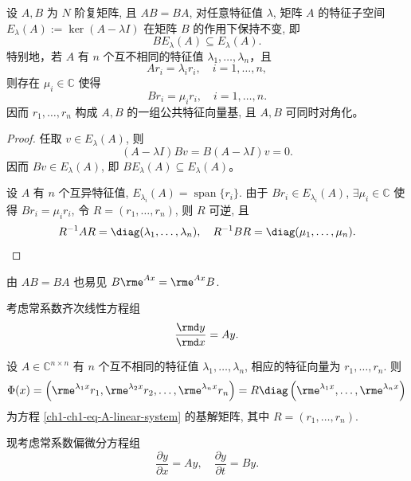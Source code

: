 \begin{lemma}\label{ch1-lem-commuting-matrices}
    设 $A, B$ 为 $N$ 阶复矩阵, 且 $AB=BA$, 对任意特征值 $\lambda$, 矩阵 $A$ 的特征子空间 $E_{\lambda}(A) := \ker(A-\lambda I)$ 在矩阵 $B$ 的作用下保持不变, 即
    \begin{equation}
        B E_{\lambda}(A) \subseteq E_{\lambda}(A).
    \end{equation}
    特别地，若 $A$ 有 $n$ 个互不相同的特征值
    $\lambda_{1},\ldots,\lambda_{n}$，且
    \begin{equation}
        A r_{i} =\lambda_{i} r_{i}, \quad i = 1, \ldots, n,
    \end{equation}
    则存在 $\mu_i\in\mathbb{C}$ 使得
    \begin{equation}
        B r_{i}=\mu_{i} r_{i}, \quad i = 1, \ldots, n.
    \end{equation}
    因而 $r_1,\ldots,r_n$ 构成 $A,B$ 的一组公共特征向量基, 且 $A,B$ 可同时对角化。
\end{lemma}

\begin{proof}
    任取 $v\in E_{\lambda}(A)$, 则
    \begin{equation}
        (A-\lambda I)Bv = B(A-\lambda I)v = 0.
    \end{equation}
    因而 $Bv\in E_{\lambda}(A)$, 即
    $B E_{\lambda}(A)\subseteq E_{\lambda}(A)$。

    设 $A$ 有 $n$ 个互异特征值, $E_{\lambda_{i}}(A) = \operatorname{span} \{r_i\}$. 由于 $B r_{i} \in E_{\lambda_{i}}(A)$, $ \exists \mu_{i} \in \mathbb{C}$ 使得 $B r_{i}=\mu_{i} r_{i}$, 令 $R=(r_{1}, \ldots, r_{n})$, 则 $R$ 可逆, 且
    \begin{equation}
        R^{-1}AR = \diag(\lambda_1,\ldots,\lambda_n), \quad
        R^{-1}BR = \diag(\mu_1,\ldots,\mu_n).
    \end{equation}
\end{proof}
\begin{remark}
    由 $A B = B A$ 也易见 $B \rme^{A x}=\rme^{A x} B$.
\end{remark}
考虑常系数齐次线性方程组
\begin{equation}
    \frac{\rmd y}{\rmd x}
    =
    Ay.
    \label{ch1-ch1-eq-A-linear-system}
\end{equation}

\begin{corollary}
    设 $A\in\mathbb{C}^{n\times n}$ 有 $n$ 个互不相同的特征值 $\lambda_1,\ldots,\lambda_n$, 相应的特征向量为 $r_1, \ldots, r_n$. 则
    \begin{equation}
        \Phi(x) = \left( \rme^{\lambda_1x}r_1, \rme^{\lambda_2x}r_2, \ldots, \rme^{\lambda_nx}r_n \right) = R \diag\left( \rme^{\lambda_1x}, \ldots, \rme^{\lambda_nx} \right)
    \end{equation}
    为方程 \eqref{ch1-ch1-eq-A-linear-system} 的基解矩阵, 其中
    $R=(r_{1},\ldots,r_{n})$.
\end{corollary}
现考虑常系数偏微分方程组
\begin{equation}
    \frac{\partial y}{\partial x} = A y, \quad
    \frac{\partial y}{\partial t} = B y.
    \label{ch1-ch1-eq-AB-linear-system}
\end{equation}


